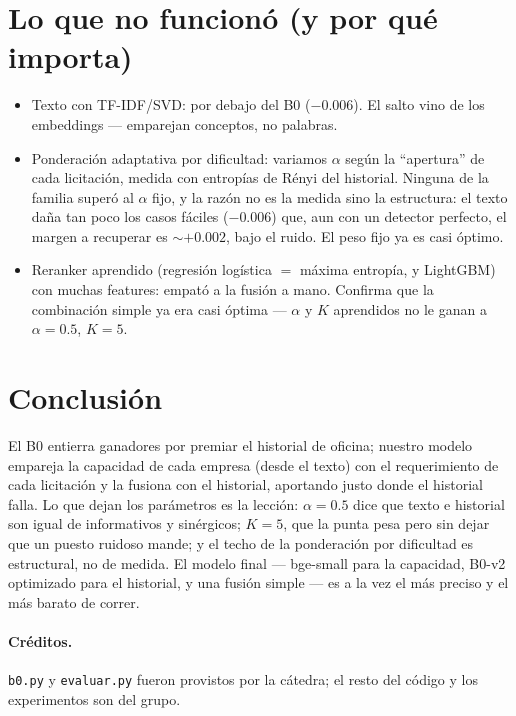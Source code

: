 \documentclass[11pt]{article}
\begin{document}
\section{Lo que no funcionó (y por qué importa)}

\begin{itemize}\itemsep1pt
  \item Texto con TF-IDF/SVD: por debajo del B0 ($-0.006$). El salto vino de los embeddings ---
  emparejan conceptos, no palabras.
  \item Ponderación adaptativa por dificultad: variamos $\alpha$ según la ``apertura'' de cada
  licitación, medida con entropías de Rényi del historial. Ninguna de la familia superó al $\alpha$
  fijo, y la razón no es la medida sino la estructura: el texto daña tan poco los casos fáciles
  ($-0.006$) que, aun con un detector perfecto, el margen a recuperar es $\sim+0.002$, bajo el ruido.
  El peso fijo ya es casi óptimo.
  \item Reranker aprendido (regresión logística $=$ máxima entropía, y LightGBM) con muchas
  features: empató a la fusión a mano. Confirma que la combinación simple ya era casi óptima ---
  $\alpha$ y $K$ aprendidos no le ganan a $\alpha{=}0.5$, $K{=}5$.
\end{itemize}

\section{Conclusión}

El B0 entierra ganadores por premiar el historial de oficina; nuestro modelo empareja la capacidad
de cada empresa (desde el texto) con el requerimiento de cada licitación y la fusiona con el
historial, aportando justo donde el historial falla. Lo que dejan los parámetros es la lección:
$\alpha{=}0.5$ dice que texto e historial son igual de informativos y sinérgicos; $K{=}5$, que la
punta pesa pero sin dejar que un puesto ruidoso mande; y el techo de la ponderación por dificultad
es estructural, no de medida. El modelo final --- bge-small para la capacidad, B0-v2 optimizado para
el historial, y una fusión simple --- es a la vez el más preciso y el más barato de correr.

\paragraph{Créditos.} \texttt{b0.py} y \texttt{evaluar.py} fueron provistos por la cátedra; el resto
del código y los experimentos son del grupo.
\end{document}
